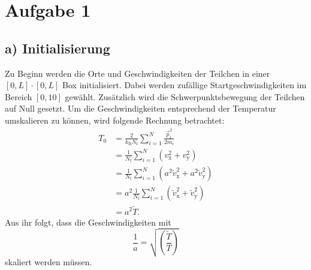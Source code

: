 \section*{Aufgabe 1}


\subsection*{a) Initialisierung}

Zu Beginn werden die Orte und Geschwindigkeiten der Teilchen in einer $[0,L] \cdot [0,L]$ Box initialisiert.
Dabei werden zufällige Startgeschwindigkeiten im Bereich \([0, 10]\) gewählt. 
Zusätzlich wird die Schwerpunktsbewegung der Teilchen auf Null gesetzt.
Um die Geschwindigkeiten entsprechend der Temperatur umskalieren zu können, wird folgende Rechnung betrachtet:
\begin{align*}
    T_0 &=
    \frac{2}{k_\text{B} N_\text{f}} \sum_{i=1}^N \frac{\vec{p}_\text{i}^2}{2 m_\text{i}} \\
    &= \frac{1}{N_\text{f}} \sum_{i=1}^N \left(v_\text{x}^2 + v_\text{y}^2\right) \\
    &= \frac{1}{N_\text{f}} \sum_{i=1}^N
        \left(a^2 \tilde{v}_\text{x}^2 + a^2 \tilde{v}_\text{y}^2\right) \\
    &= a^2 \frac{1}{N_\text{f}} \sum_{i=1}^N
        \left(\tilde{v}_\text{x}^2 + \tilde{v}_\text{y}^2\right) \\
    &= a^2 \tilde{T}.
\end{align*}
Aus ihr folgt, dass die Geschwindigkeiten mit 
\begin{equation*}
    \frac{1}{a} = \sqrt{\!\left(\frac{\tilde{T}}{T}\right)}
\end{equation*}
skaliert werden müssen.

